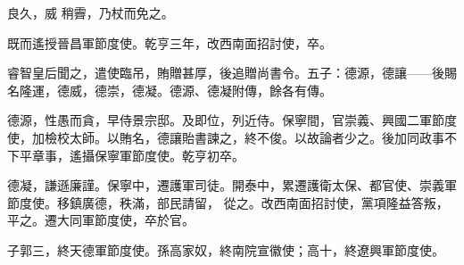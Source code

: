\begin{pinyinscope}
 良久，威
 稍霽，乃杖而免之。



 既而遙授晉昌軍節度使。乾亨三年，改西南面招討使，卒。



 睿智皇后聞之，遣使臨吊，賄贈甚厚，後追贈尚書令。五子：德源，德讓——後賜名隆運，德威，德崇，德凝。德源、德凝附傳，餘各有傳。



 德源，性愚而貪，早侍景宗邸。及即位，列近侍。保寧間，官崇義、興國二軍節度使，加檢校太師。以賄名，德讓貽書諫之，終不俊。以故論者少之。後加同政事不下平章事，遙攝保寧軍節度使。乾亨初卒。



 德凝，謙遜廉謹。保寧中，遷護軍司徒。開泰中，累遷護衛太保、都官使、崇義軍節度使。移鎮廣德，秩滿，部民請留，
 從之。改西南面招討使，黨項隆益答叛，平之。遷大同軍節度使，卒於官。



 子郭三，終天德軍節度使。孫高家奴，終南院宣徽使；高十，終遼興軍節度使。



\end{pinyinscope}